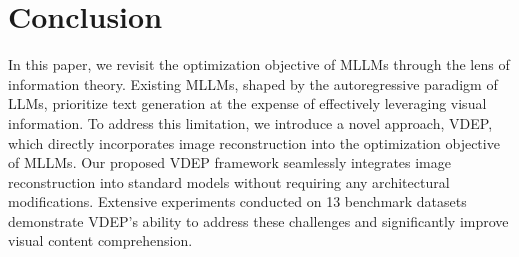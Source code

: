 \section{Conclusion}
\label{conclusion}
In this paper, we revisit the optimization objective of MLLMs through the lens of information theory. Existing MLLMs, shaped by the autoregressive paradigm of LLMs, prioritize text generation at the expense of effectively leveraging visual information. To address this limitation, we introduce a novel approach, VDEP, which directly incorporates image reconstruction into the optimization objective of MLLMs. Our proposed VDEP framework seamlessly integrates image reconstruction into standard models without requiring any architectural modifications. Extensive experiments conducted on 13 benchmark datasets demonstrate VDEP's ability to address these challenges and significantly improve visual content comprehension.
